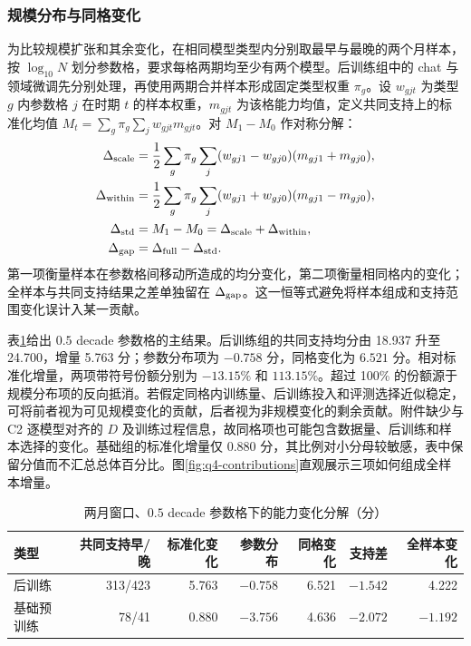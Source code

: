 \subsubsection{规模分布与同格变化}

为比较规模扩张和其余变化，在相同模型类型内分别取最早与最晚的两个月样本，按 $\log_{10}N$ 划分参数格，要求每格两期均至少有两个模型。后训练组中的 chat 与领域微调先分别处理，再使用两期合并样本形成固定类型权重 $\pi_g$。设 $w_{gjt}$ 为类型 $g$ 内参数格 $j$ 在时期 $t$ 的样本权重，$m_{gjt}$ 为该格能力均值，定义共同支持上的标准化均值 $M_t=\sum_g\pi_g\sum_jw_{gjt}m_{gjt}$。对 $M_1-M_0$ 作对称分解：
\begin{align}
 \Delta_{\rm scale}
 &=\frac12\sum_g\pi_g\sum_j(w_{gj1}-w_{gj0})(m_{gj1}+m_{gj0}),
 \label{eq:q4-scale-term}\\
 \Delta_{\rm within}
 &=\frac12\sum_g\pi_g\sum_j(w_{gj1}+w_{gj0})(m_{gj1}-m_{gj0}),
 \label{eq:q4-within-term}\\
 \Delta_{\rm std}&=M_1-M_0=\Delta_{\rm scale}+\Delta_{\rm within},\nonumber\\
 \Delta_{\rm gap}&=\Delta_{\rm full}-\Delta_{\rm std}.
 \label{eq:q4-gap}
\end{align}
第一项衡量样本在参数格间移动所造成的均分变化，第二项衡量相同格内的变化；全样本与共同支持结果之差单独留在 $\Delta_{\rm gap}$。这一恒等式避免将样本组成和支持范围变化误计入某一贡献。

表\ref{tab:q4-decomp}给出 $0.5$ decade 参数格的主结果。后训练组的共同支持均分由 18.937 升至 24.700，增量 5.763 分；参数分布项为 $-0.758$ 分，同格变化为 $6.521$ 分。相对标准化增量，两项带符号份额分别为 $-13.15\%$ 和 $113.15\%$。超过 100\% 的份额源于规模分布项的反向抵消。若假定同格内训练量、后训练投入和评测选择近似稳定，可将前者视为可见规模变化的贡献，后者视为非规模变化的剩余贡献。附件缺少与 C2 逐模型对齐的 $D$ 及训练过程信息，故同格项也可能包含数据量、后训练和样本选择的变化。基础组的标准化增量仅 0.880 分，其比例对小分母较敏感，表中保留分值而不汇总总体百分比。图\ref{fig:q4-contributions}直观展示三项如何组成全样本增量。

\begin{table}[htbp]
 \centering\small
 \caption{两月窗口、$0.5$ decade 参数格下的能力变化分解（分）}
 \label{tab:q4-decomp}
 \begin{tabular}{lrrrrrr}
 \toprule
 类型 & 共同支持早/晚 & 标准化变化 & 参数分布 & 同格变化 & 支持差 & 全样本变化\\
 \midrule
 后训练 & 313/423 & 5.763 & $-0.758$ & 6.521 & $-1.542$ & 4.222\\
 基础预训练 & 78/41 & 0.880 & $-3.756$ & 4.636 & $-2.072$ & $-1.192$\\
 \bottomrule
 \end{tabular}
\end{table}

